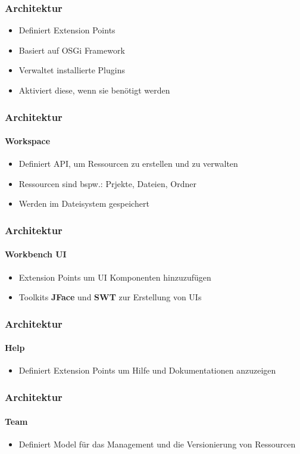 {\begin{frame}
  \frametitle{Architektur}
  \begin{itemize}
    \item Definiert Extension Points
    \item Basiert auf OSGi Framework
    \item Verwaltet installierte Plugins
    \item Aktiviert diese, wenn sie benötigt werden
  \end{itemize}
\end{frame}

\begin{frame}
  \frametitle{Architektur}
  \framesubtitle{Workspace}
  \begin{itemize}
    \item Definiert API, um Ressourcen zu erstellen und zu verwalten
    \item Ressourcen sind bspw.: Prjekte, Dateien, Ordner
    \item Werden im Dateisystem gespeichert
  \end{itemize}
\end{frame}

\begin{frame}
  \frametitle{Architektur}
  \framesubtitle{Workbench UI}
  \begin{itemize}
    \item Extension Points um UI Komponenten hinzuzufügen
    \item Toolkits \textbf{JFace} und \textbf{SWT} zur Erstellung von UIs
  \end{itemize}
\end{frame}

\begin{frame}
  \frametitle{Architektur}
  \framesubtitle{Help}
  \begin{itemize}
    \item Definiert Extension Points um Hilfe und Dokumentationen anzuzeigen
  \end{itemize}
\end{frame}

\begin{frame}
  \frametitle{Architektur}
  \framesubtitle{Team}
  \begin{itemize}
    \item Definiert Model für das Management und die Versionierung von Ressourcen
  \end{itemize}
\end{frame}

}
